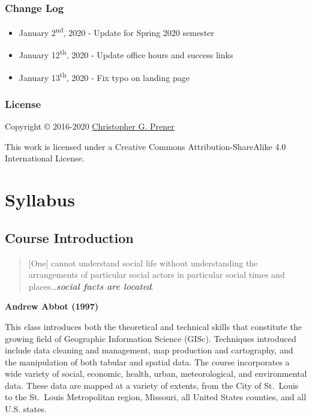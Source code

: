 \documentclass[
]{book}
\providecommand{\tightlist}{%
  \setlength{\itemsep}{0pt}\setlength{\parskip}{0pt}}
\begin{document}
\hypertarget{change-log}{%
\section*{Change Log}\label{change-log}}

\begin{itemize}
\tightlist
\item
  January 2\textsuperscript{nd}, 2020 - Update for Spring 2020 semester
\item
  January 12\textsuperscript{th}, 2020 - Update office hours and success links
\item
  January 13\textsuperscript{th}, 2020 - Fix typo on landing page
\end{itemize}

\hypertarget{license}{%
\section*{License}\label{license}}

Copyright © 2016-2020 \href{https://chris-prener.github.io}{Christopher G. Prener}

This work is licensed under a Creative Commons Attribution-ShareAlike 4.0 International License.

\hypertarget{part-syllabus}{%
\part{Syllabus}\label{part-syllabus}}

\hypertarget{course-introduction}{%
\chapter{Course Introduction}\label{course-introduction}}

\begin{quote}
{[}One{]} cannot understand social life without understanding the arrangements of particular social actors in particular social times and places\ldots{}\textbf{\emph{social facts are located}}.
\end{quote}

\textbf{Andrew Abbot (1997)}

This class introduces both the theoretical and technical skills that constitute the growing field of Geographic Information Science (GISc). Techniques introduced include data cleaning and management, map production and cartography, and the manipulation of both tabular and spatial data. The course incorporates a wide variety of social, economic, health, urban, meteorological, and environmental data. These data are mapped at a variety of extents, from the City of St.~Louis to the St.~Louis Metropolitan region, Missouri, all United States counties, and all U.S. states.
\end{document}
